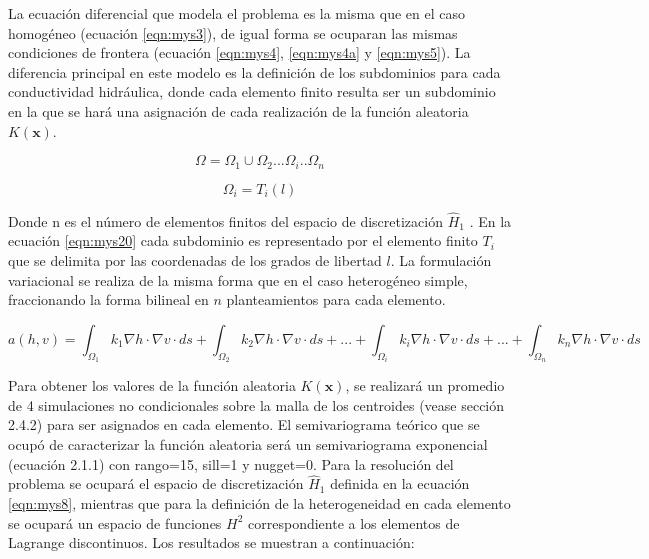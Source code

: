 La ecuación diferencial que modela el problema es la misma que en el caso homogéneo (ecuación \ref{eqn:mys3}), de igual forma se ocuparan las mismas condiciones de frontera (ecuación \ref{eqn:mys4}, \ref{eqn:mys4a} y \ref{eqn:mys5}). La diferencia principal en este modelo es la definición de los subdominios para cada conductividad hidráulica, donde cada elemento finito resulta ser un subdominio en la que se hará una asignación de cada realización de la función aleatoria $K(\textbf{x})$.

 \begin{equation}
\label{eqn:mys20}                         
{\Omega}={\Omega}_{1}{\cup}{\Omega}_{2}...{\Omega}_{i}..{\Omega}_{n} 
\end{equation} 

 \begin{equation}
\label{eqn:mys21}                         
{\Omega}_{i}=T_{i}(l)
\end{equation}

Donde n es el número de elementos finitos del espacio de discretización $\hat{H}_{1}$
. En la ecuación \ref{eqn:mys20} cada subdominio es representado por el elemento finito $T_{i}$ que se delimita por las coordenadas de los grados de libertad $l$. La formulación variacional se realiza de la misma forma que en el caso heterogéneo simple, fraccionando la forma bilineal en $n$ planteamientos para cada elemento.

\begin{equation}
 \label{eqn:mys22}
 a(h,v)=\int_{\Omega_{1}}^{} k_{1}{\nabla}h{\cdot}{\nabla}v \cdot ds+\int_{\Omega_{2}}^{} k_{2}{\nabla}h{\cdot}{\nabla}v \cdot ds+...+\int_{\Omega_{i}}^{} k_{i}{\nabla}h{\cdot}{\nabla}v \cdot ds+...+\int_{\Omega_{n}}^{} k_{n}{\nabla}h{\cdot}{\nabla}v \cdot ds
\end{equation}

Para obtener los valores de la función aleatoria $K(\textbf{x})$, se realizará un promedio de 4 simulaciones no condicionales sobre la malla de los centroides (vease sección 2.4.2) para ser asignados en cada elemento. El semivariograma teórico que se ocupó de caracterizar la función aleatoria será un semivariograma exponencial (ecuación 2.1.1) con rango=15, sill=1 y nugget=0. Para la resolución del problema se ocupará el espacio de discretización $\hat{H}_{1}$ definida en la ecuación \ref{eqn:mys8}, mientras que para la definición de la heterogeneidad en cada elemento se ocupará un espacio de funciones $H^{2}$ correspondiente a los elementos de Lagrange discontinuos. Los resultados se muestran a continuación:

